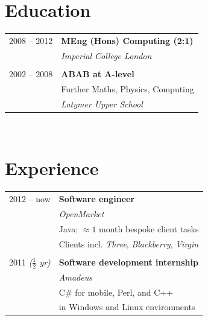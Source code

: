 \documentclass[10pt]{article} %
\begin{document}
\begin{minipage}[t]{0.44\textwidth}
\section{Education} 

\begin{tabular}{rl} %


2008 -- 2012 & \textbf{MEng (Hons) Computing (2:1)} \\ 
& \textit{Imperial College London}\\
	 

&\\
2002 -- 2008 & \textbf{ABAB at A-level} \\ 
& \small Further Maths, Physics, Computing \\
& \textit{Latymer Upper School}\\
	

\end{tabular}\\[10pt]


\section{Experience}

\begin{tabular}{rl}

2012 -- now & \textbf{Software engineer}\\
& \textit{OpenMarket}\\
& Java; $\approx1$ month bespoke client tasks \\
& Clients incl. \textit{Three}, \textit{Blackberry}, \textit{Virgin} \\
& \\
2011 \textit{($\frac{1}{2}$ yr)} & \textbf{Software development internship}\\
& \textit{Amadeus}\\
& C\# for mobile, Perl, and C++\\
& in Windows and Linux environments \\


\end{tabular}
\end{minipage}
\end{document}

